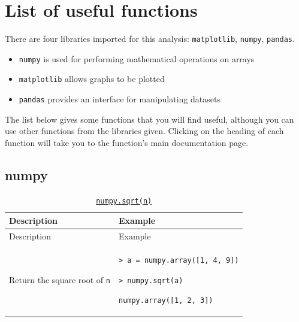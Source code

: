 \documentclass[10pt,a4paperpaper,]{article}
\date{}
\providecommand{\tightlist}{%
  \setlength{\itemsep}{0pt}\setlength{\parskip}{0pt}}
\begin{document}
\section{List of useful functions}\label{list-of-useful-functions}

There are four libraries imported for this analysis:
\texttt{matplotlib}, \texttt{numpy}, \texttt{pandas}.

\begin{itemize}
\tightlist
\item
  \texttt{numpy} is used for performing mathematical operations on
  arrays
\item
  \texttt{matplotlib} allows graphs to be plotted
\item
  \texttt{pandas} provides an interface for manipulating datasets
\end{itemize}

The list below gives some functions that you will find useful, although
you can use other functions from the libraries given. Clicking on the
heading of each function will take you to the function's main
documentation page.

\subsection{numpy}\label{numpy}

\begin{longtable}[]{@{}ll@{}}
\caption{\href{http://docs.scipy.org/doc/numpy/reference/generated/numpy.sqrt.html}{\texttt{numpy.sqrt(n)}}}\tabularnewline
\toprule
\begin{minipage}[b]{0.47\columnwidth}\raggedright\strut
Description
\strut\end{minipage} &
\begin{minipage}[b]{0.47\columnwidth}\raggedright\strut
Example
\strut\end{minipage}\tabularnewline
\midrule
\endfirsthead
\toprule
\begin{minipage}[b]{0.47\columnwidth}\raggedright\strut
Description
\strut\end{minipage} &
\begin{minipage}[b]{0.47\columnwidth}\raggedright\strut
Example
\strut\end{minipage}\tabularnewline
\midrule
\endhead
\begin{minipage}[t]{0.47\columnwidth}\raggedright\strut
Return the square root of \texttt{n}
\strut\end{minipage} &
\begin{minipage}[t]{0.47\columnwidth}\raggedright\strut
\texttt{\textgreater{}\ a\ =\ numpy.array({[}1,\ 4,\ 9{]})}

\texttt{\textgreater{}\ numpy.sqrt(a)}

\texttt{numpy.array({[}1,\ 2,\ 3{]})}
\strut\end{minipage}\tabularnewline
\bottomrule
\end{longtable}
\end{document}
